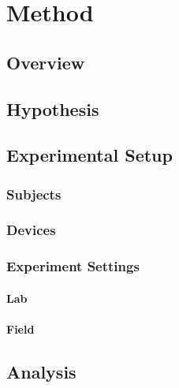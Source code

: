 \chapter{Method\label{cha:chapter5}}
\section{Overview}
\section{Hypothesis}
\section{Experimental Setup}
\subsection{Subjects}
\subsection{Devices}
\subsection{Experiment Settings}
\subsubsection{Lab}
\subsubsection{Field}
\section{Analysis}

